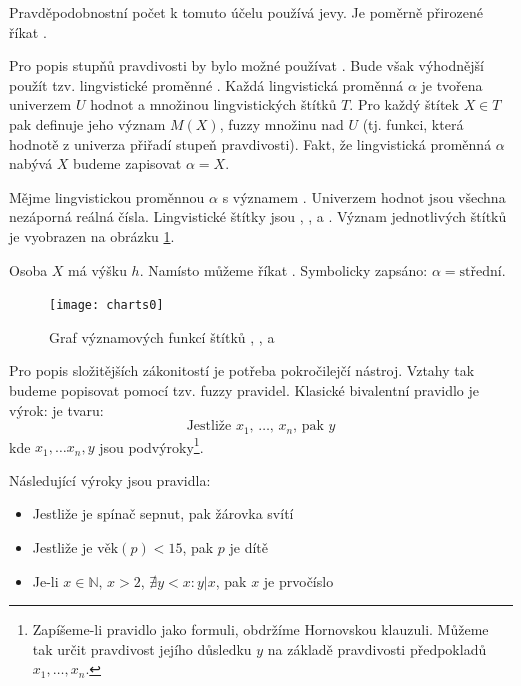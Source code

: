 \documentclass[a4paper,10pt]{article}
\begin{document}
Pravděpodobnostní počet k tomuto účelu používá jevy. Je poměrně přirozené říkat .

Pro popis stupňů pravdivosti by bylo možné používat . Bude však výhodnější použít tzv. lingvistické proměnné \cite{Zad-ConLingVarAppApprRea}. Každá lingvistická proměnná $\alpha$ je tvořena univerzem $U$ hodnot a množinou lingvistických štítků $T$. Pro každý štítek $X \in T$ pak definuje jeho význam $M(X)$, fuzzy množinu nad $U$ (tj. funkci, která hodnotě z univerza přiřadí stupeň pravdivosti). Fakt, že lingvistická proměnná $\alpha$ nabývá  $X$ budeme zapisovat $\alpha = X$.

\begin{example}
 Mějme lingvistickou proměnnou $\alpha$ s významem . Univerzem hodnot jsou všechna nezáporná reálná čísla. Lingvistické štítky jsou , ,  a . Význam jednotlivých štítků je vyobrazen na obrázku \ref{fig:lingVarsMeansChart}.

 Osoba $X$ má výšku $h$. Namísto  můžeme říkat . Symbolicky zapsáno: $\alpha = \text{střední}$.
\end{example}

\begin{figure}
 \centering
 \texttt{[image: charts0]}
 
 \caption{Graf významových funkcí štítků , ,  a } \label{fig:lingVarsMeansChart}
\end{figure}

Pro popis složitějších zákonitostí je potřeba pokročilejčí nástroj. Vztahy tak budeme popisovat pomocí tzv. fuzzy \ifthen pravidel. Klasické bivalentní \ifthen pravidlo je výrok: je tvaru:
$$
 \text{Jestliže $x_1$, $\dots$, $x_n$, pak $y$}
$$
kde $x_1, \dots x_n, y$ jsou podvýroky\footnote{Zapíšeme-li \ifthen pravidlo jako formuli, obdržíme Hornovskou klauzuli. Můžeme tak určit pravdivost jejího důsledku $y$ na základě pravdivosti předpokladů $x_1, \dots, x_n$.}.

\begin{example}
 Následující výroky jsou \ifthen pravidla:
 \begin{itemize}
  \item Jestliže je spínač sepnut, pak žárovka svítí
  \item Jestliže je $\text{věk}(p) < 15$, pak $p$ je dítě
  \item Je-li $x \in \mathbb{N}$, $x > 2$, $\nexists y < x: y|x$, pak $x$ je prvočíslo
 \end{itemize}
\end{example}
\end{document}

